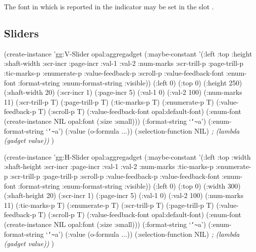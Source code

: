 The font in which  is reported in the indicator may be set
in the slot .


\begin{group}
\section{Sliders}
\label{sliders}

\begin{programexample}
(create-instance 'gg:V-Slider opal:aggregadget
   (:maybe-constant '(:left :top :height :shaft-width :scr-incr :page-incr :val-1 :val-2
                      :num-marks :scr-trill-p :page-trill-p :tic-marks-p :enumerate-p
                      :value-feedback-p :scroll-p :value-feedback-font :enum-font
                      :format-string :enum-format-string :visible))
   (:left 0)
   (:top 0)
   (:height 250)
   (:shaft-width 20)
   (:scr-incr 1)
   (:page-incr 5)
   (:val-1 0)
   (:val-2 100)
   (:num-marks 11)
   (:scr-trill-p T)
   (:page-trill-p T)
   (:tic-marks-p T)
   (:enumerate-p T)
   (:value-feedback-p T)
   (:scroll-p T)
   (:value-feedback-font opal:default-font)
   (:enum-font (create-instance NIL opal:font (:size :small)))
   (:format-string `{\tt\char`\~}a')
   (:enum-format-string `{\tt\char`\~}a')
   (:value (o-formula ...))
   (:selection-function NIL)   {\it ; (lambda (gadget value))}
   )
\end{programexample}
\end{group}
\vspace{1 line}

\begin{programexample}
\begin{group}
(create-instance 'gg:H-Slider opal:aggregadget
   (:maybe-constant '(:left :top :width :shaft-height :scr-incr :page-incr :val-1 :val-2
                      :num-marks :tic-marks-p :enumerate-p :scr-trill-p :page-trill-p
                      :scroll-p :value-feedback-p :value-feedback-font :enum-font
                      :format-string :enum-format-string :visible))
   (:left 0)
   (:top 0)
   (:width 300)
   (:shaft-height 20)
   (:scr-incr 1)
   (:page-incr 5)
   (:val-1 0)
   (:val-2 100)
   (:num-marks 11)
   (:tic-marks-p T)
   (:enumerate-p T)
   (:scr-trill-p T)
   (:page-trill-p T)
   (:value-feedback-p T)
   (:scroll-p T)
   (:value-feedback-font opal:default-font)
   (:enum-font (create-instance NIL opal:font (:size :small)))
   (:format-string `{\tt\char`\~}a')
   (:enum-format-string `{\tt\char`\~}a')
   (:value (o-formula ...))
   (:selection-function NIL)   {\it ; (lambda (gadget value))}
   )
\end{group}
\end{programexample}


